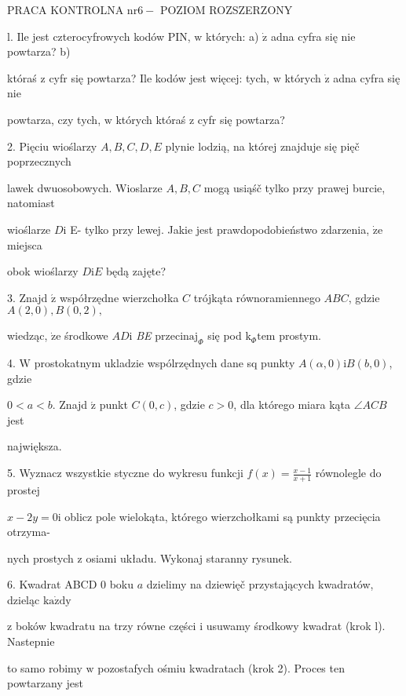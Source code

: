 \documentclass[a4paper,12pt]{article}
\begin{document}
PRACA KONTROLNA $\mathrm{n}\mathrm{r} 6-$ POZIOM ROZSZERZONY

l. Ile jest czterocyfrowych kodów PIN, $\mathrm{w}$ których: a) $\dot{\mathrm{z}}$ adna cyfra się nie powtarza? b)

któraś $\mathrm{z}$ cyfr się powtarza? Ile kodów jest więcej: tych, $\mathrm{w}$ których $\dot{\mathrm{z}}$ adna cyfra się nie

powtarza, czy tych, $\mathrm{w}$ których któraś $\mathrm{z}$ cyfr się powtarza?

2. Pięciu wioślarzy $A, B, C, D, E$ plynie lodzią, na której znajduje się pięč poprzecznych

lawek dwuosobowych. Wioslarze $A, B, C$ mogą usiąśč tylko przy prawej burcie, natomiast

wioślarze $D\mathrm{i}$ E- tylko przy lewej. Jakie jest prawdopodobieństwo zdarzenia, $\dot{\mathrm{z}}\mathrm{e}$ miejsca

obok wioślarzy $D\mathrm{i}E$ będą zajęte?

3. Znajd $\acute{\mathrm{z}}$ współrzędne wierzchołka $C$ trójkąta równoramiennego $ABC$, gdzie $A(2,0), B(0,2),$

wiedząc, $\dot{\mathrm{z}}\mathrm{e}$ środkowe $AD\mathrm{i}$ {\it BE} $\mathrm{p}\mathrm{r}\mathrm{z}\mathrm{e}\mathrm{c}\mathrm{i}\mathrm{n}\mathrm{a}\mathrm{j}_{\Phi}$ się pod $\mathrm{k}_{\Phi}\mathrm{t}\mathrm{e}\mathrm{m}$ prostym.

4. $\mathrm{W}$ prostokatnym ukladzie wspólrzędnych dane sq punkty $A(\alpha,0)\mathrm{i}B(b,0)$, gdzie

$0 < a < b.$ Znajd $\acute{\mathrm{z}}$ punkt $C(0,c)$, gdzie $c > 0$, dla którego miara kąta $\angle ACB$ jest

największa.

5. Wyznacz wszystkie styczne do wykresu funkcji $f(x)=\displaystyle \frac{x-1}{x+1}$ równolegle do prostej

$x-2y=0\mathrm{i}$ oblicz pole wielokąta, którego wierzchołkami są punkty przecięcia otrzyma-

nych prostych $\mathrm{z}$ osiami układu. Wykonaj staranny rysunek.

6. Kwadrat ABCD $0$ boku $a$ dzielimy na dziewięč przystających kwadratów, dzieląc $\mathrm{k}\mathrm{a}\dot{\mathrm{z}}\mathrm{d}\mathrm{y}$

$\mathrm{z}$ boków kwadratu na trzy równe części $\mathrm{i}$ usuwamy środkowy kwadrat (krok l). Nastepnie

to samo robimy $\mathrm{w}$ pozostafych ośmiu kwadratach (krok 2). Proces ten powtarzany jest
\end{document}
